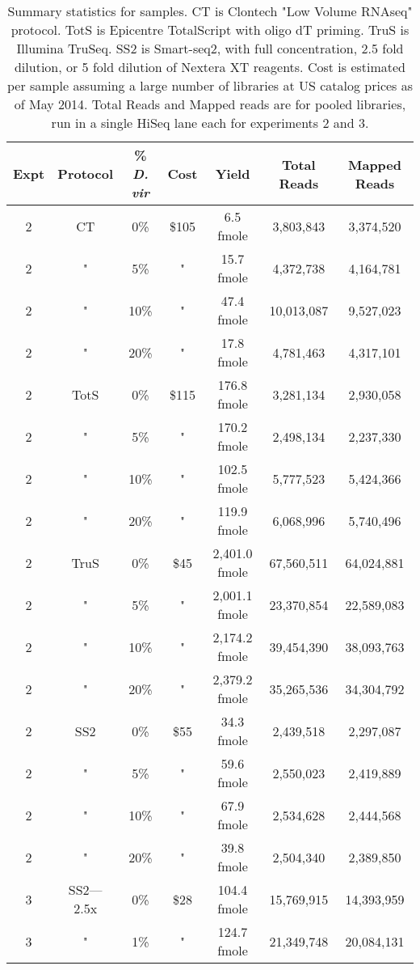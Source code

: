 \begin{table}[htdp]
\caption{Summary statistics for samples. CT is Clontech "Low Volume RNAseq" protocol. TotS is Epicentre TotalScript with oligo dT priming. TruS is Illumina TruSeq. SS2 is Smart-seq2, with full concentration, 2.5 fold dilution, or 5 fold dilution of Nextera XT reagents. Cost is estimated per sample assuming a
     large number of libraries at US catalog prices as of May 2014. Total Reads
     and Mapped reads are for pooled libraries, run in a single HiSeq lane each
     for experiments 2 and 3. }
\begin{center}
\begin{tabular}{|c|c|c|c|c|c|c|} \hline
      Expt & Protocol & \% {\em D. vir} & Cost &  Yield & Total Reads & Mapped Reads \\\hline 
2 & CT & 0\% & \$105 & 6.5 fmole & 3,803,843 &3,374,520 \\
2 & " & 5\% & " & 15.7 fmole & 4,372,738 &4,164,781 \\
2 & " & 10\% & " & 47.4 fmole & 10,013,087 &9,527,023 \\
2 & " & 20\% & " & 17.8 fmole & 4,781,463 &4,317,101 \\
2 & TotS & 0\% & \$115 & 176.8 fmole & 3,281,134 &2,930,058 \\
2 & " & 5\% & " & 170.2 fmole & 2,498,134 &2,237,330 \\
2 & " & 10\% & " & 102.5 fmole & 5,777,523 &5,424,366 \\
2 & " & 20\% & " & 119.9 fmole & 6,068,996 &5,740,496 \\
2 & TruS & 0\% & \$45 & 2,401.0 fmole & 67,560,511 &64,024,881 \\
2 & " & 5\% & " & 2,001.1 fmole & 23,370,854 &22,589,083 \\
2 & " & 10\% & " & 2,174.2 fmole & 39,454,390 &38,093,763 \\
2 & " & 20\% & " & 2,379.2 fmole & 35,265,536 &34,304,792 \\
2 & SS2 & 0\% & \$55 & 34.3 fmole & 2,439,518 &2,297,087 \\
2 & " & 5\% & " & 59.6 fmole & 2,550,023 &2,419,889 \\
2 & " & 10\% & " & 67.9 fmole & 2,534,628 &2,444,568 \\
2 & " & 20\% & " & 39.8 fmole & 2,504,340 &2,389,850 \\
3 & SS2---2.5x & 0\% & \$28 & 104.4 fmole & 15,769,915 &14,393,959 \\
3 & " & 1\% & " & 124.7 fmole & 21,349,748 &20,084,131 \\

\end{tabular}
\end{center}
\end{table}

